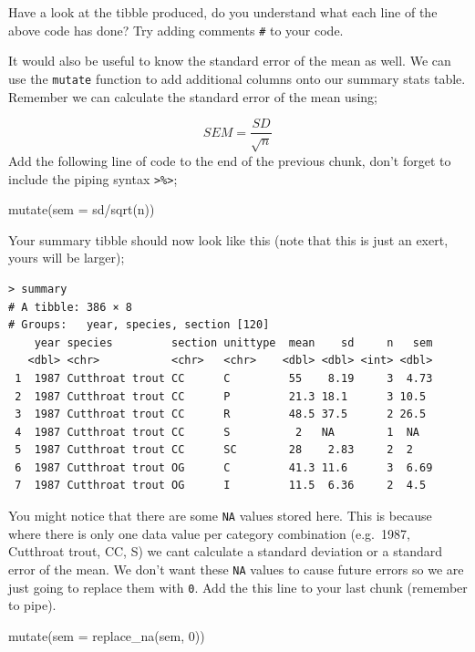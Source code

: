 \documentclass[
]{book}
\newenvironment{Shaded}{\begin{snugshade}}{\end{snugshade}}
\newcommand{\AttributeTok}[1]{\textcolor[rgb]{0.77,0.63,0.00}{#1}}
\newcommand{\DecValTok}[1]{\textcolor[rgb]{0.00,0.00,0.81}{#1}}
\newcommand{\FunctionTok}[1]{\textcolor[rgb]{0.00,0.00,0.00}{#1}}
\newcommand{\NormalTok}[1]{#1}
\newcommand{\SpecialCharTok}[1]{\textcolor[rgb]{0.00,0.00,0.00}{#1}}
\begin{document}
Have a look at the tibble produced, do you understand what each line of the above code has done? Try adding comments \texttt{\#} to your code.

It would also be useful to know the standard error of the mean as well. We can use the \texttt{mutate} function to add additional columns onto our summary stats table. Remember we can calculate the standard error of the mean using;

\[
SEM = \frac{SD}{\sqrt{n}}
\]
Add the following line of code to the end of the previous chunk, don't forget to include the piping syntax \texttt{\textgreater{}\%\textgreater{}};

\begin{Shaded}
\begin{Highlighting}[]
\FunctionTok{mutate}\NormalTok{(}\AttributeTok{sem =}\NormalTok{ sd}\SpecialCharTok{/}\FunctionTok{sqrt}\NormalTok{(n))}
\end{Highlighting}
\end{Shaded}

Your summary tibble should now look like this (note that this is just an exert, yours will be larger);

\begin{verbatim}
> summary
# A tibble: 386 × 8
# Groups:   year, species, section [120]
    year species         section unittype  mean    sd     n   sem
   <dbl> <chr>           <chr>   <chr>    <dbl> <dbl> <int> <dbl>
 1  1987 Cutthroat trout CC      C         55    8.19     3  4.73
 2  1987 Cutthroat trout CC      P         21.3 18.1      3 10.5 
 3  1987 Cutthroat trout CC      R         48.5 37.5      2 26.5 
 4  1987 Cutthroat trout CC      S          2   NA        1  NA   
 5  1987 Cutthroat trout CC      SC        28    2.83     2  2   
 6  1987 Cutthroat trout OG      C         41.3 11.6      3  6.69
 7  1987 Cutthroat trout OG      I         11.5  6.36     2  4.5 
\end{verbatim}

You might notice that there are some \texttt{NA} values stored here. This is because where there is only one data value per category combination (e.g.~1987, Cutthroat trout, CC, S) we cant calculate a standard deviation or a standard error of the mean. We don't want these \texttt{NA} values to cause future errors so we are just going to replace them with \texttt{0}. Add the this line to your last chunk (remember to pipe).

\begin{Shaded}
\begin{Highlighting}[]
\FunctionTok{mutate}\NormalTok{(}\AttributeTok{sem =} \FunctionTok{replace\_na}\NormalTok{(sem, }\DecValTok{0}\NormalTok{))}
\end{Highlighting}
\end{Shaded}
\end{document}
